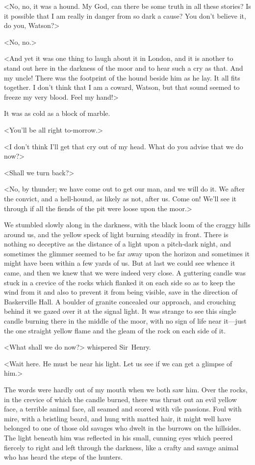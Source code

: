 <No, no, it was a hound. My God, can there be some truth in all these stories? Is it possible that I am really in danger from so dark a cause? You don't believe it, do you, Watson?>

<No, no.>

<And yet it was one thing to laugh about it in London, and it is another to stand out here in the darkness of the moor and to hear such a cry as that. And my uncle! There was the footprint of the hound beside him as he lay. It all fits together. I don't think that I am a coward, Watson, but that sound seemed to freeze my very blood. Feel my hand!>

It was as cold as a block of marble.

<You'll be all right to-morrow.>

<I don't think I'll get that cry out of my head. What do you advise that we do now?>

<Shall we turn back?>

<No, by thunder; we have come out to get our man, and we will do it. We after the convict, and a hell-hound, as likely as not, after us. Come on! We'll see it through if all the fiends of the pit were loose upon the moor.>

We stumbled slowly along in the darkness, with the black loom of the craggy hills around us, and the yellow speck of light burning steadily in front. There is nothing so deceptive as the distance of a light upon a pitch-dark night, and sometimes the glimmer seemed to be far away upon the horizon and sometimes it might have been within a few yards of us. But at last we could see whence it came, and then we knew that we were indeed very close. A guttering candle was stuck in a crevice of the rocks which flanked it on each side so as to keep the wind from it and also to prevent it from being visible, save in the direction of Baskerville Hall. A boulder of granite concealed our approach, and crouching behind it we gazed over it at the signal light. It was strange to see this single candle burning there in the middle of the moor, with no sign of life near it—just the one straight yellow flame and the gleam of the rock on each side of it.



<What shall we do now?> whispered Sir~Henry.

<Wait here. He must be near his light. Let us see if we can get a glimpse of him.>

The words were hardly out of my mouth when we both saw him. Over the rocks, in the crevice of which the candle burned, there was thrust out an evil yellow face, a terrible animal face, all seamed and scored with vile passions. Foul with mire, with a bristling beard, and hung with matted hair, it might well have belonged to one of those old savages who dwelt in the burrows on the hillsides. The light beneath him was reflected in his small, cunning eyes which peered fiercely to right and left through the darkness, like a crafty and savage animal who has heard the steps of the hunters.

